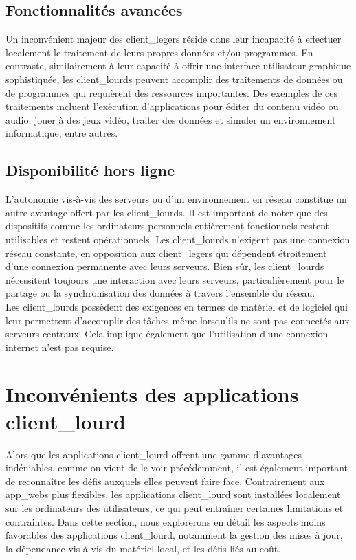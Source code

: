 \documentclass[a4paper, 12pt, french]{article}
\begin{document}
			\subsection{Fonctionnalités avancées}
				Un inconvénient majeur des \glspl{client_leger} réside dans leur incapacité à effectuer localement le traitement de leurs propres données et/ou programmes. En contraste, similairement à leur capacité à offrir une interface utilisateur graphique sophistiquée, les \glspl{client_lourd} peuvent accomplir des traitements de données ou de programmes qui requièrent des ressources importantes. Des exemples de ces traitements incluent l'exécution d'applications pour éditer du contenu vidéo ou audio, jouer à des jeux vidéo, traiter des données et simuler un environnement informatique, entre autres.

			\subsection{Disponibilité hors ligne}
				L'autonomie vis-à-vis des serveurs ou d'un environnement en réseau constitue un autre avantage offert par les \glspl{client_lourd}. Il est important de noter que des dispositifs comme les ordinateurs personnels entièrement fonctionnels restent utilisables et restent opérationnels. Les \glspl{client_lourd} n'exigent pas une connexion réseau constante, en opposition aux \glspl{client_leger} qui dépendent étroitement d'une connexion permanente avec leurs serveurs. Bien sûr, les \glspl{client_lourd} nécessitent toujours une interaction avec leurs serveurs, particulièrement pour le partage ou la synchronisation des données à travers l'ensemble du réseau.\\

				Les \glspl{client_lourd} possèdent des exigences en termes de matériel et de logiciel qui leur permettent d'accomplir des tâches même lorsqu'ils ne sont pas connectés aux serveurs centraux. Cela implique également que l'utilisation d'une connexion internet n'est pas requise.
			
		\section{Inconvénients des applications \gls{client_lourd}}
			Alors que les applications \gls{client_lourd} offrent une gamme d'avantages indéniables, comme on vient de le voir précédemment, il est également important de reconnaître les défis auxquels elles peuvent faire face. Contrairement aux \glspl{app_web} plus flexibles, les applications \gls{client_lourd} sont installées localement sur les ordinateurs des utilisateurs, ce qui peut entraîner certaines limitations et contraintes. Dans cette section, nous explorerons en détail les aspects moins favorables des applications \gls{client_lourd}, notamment la gestion des mises à jour, la dépendance vis-à-vis du matériel local, et les défis liés au coût.
			
\end{document}
